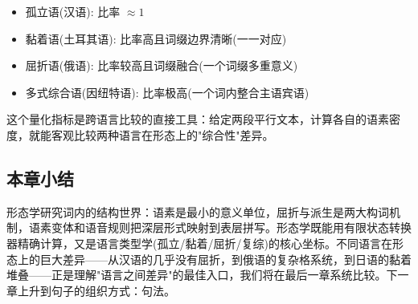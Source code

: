 \begin{itemize}
    \item 孤立语(汉语): 比率 $\approx 1$
    \item 黏着语(土耳其语): 比率高且词缀边界清晰(一一对应)
    \item 屈折语(俄语): 比率较高且词缀融合(一个词缀多重意义)
    \item 多式综合语(因纽特语): 比率极高(一个词内整合主语宾语)
\end{itemize}

这个量化指标是跨语言比较的直接工具：给定两段平行文本，计算各自的语素密度，就能客观比较两种语言在形态上的"综合性"差异。

\subsection{本章小结}

形态学研究词内的结构世界：语素是最小的意义单位，屈折与派生是两大构词机制，语素变体和语音规则把深层形式映射到表层拼写。形态学既能用有限状态转换器精确计算，又是语言类型学(孤立/黏着/屈折/复综)的核心坐标。不同语言在形态上的巨大差异——从汉语的几乎没有屈折，到俄语的复杂格系统，到日语的黏着堆叠——正是理解"语言之间差异"的最佳入口，我们将在最后一章系统比较。下一章上升到句子的组织方式：句法。
